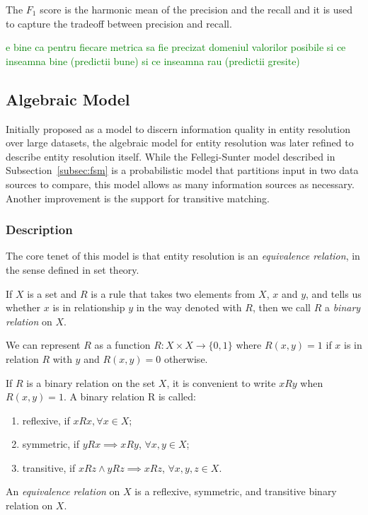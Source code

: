 \documentclass[journal]{IEEEtran}
\begin{document}
    The \textit{$F_1$} score is the harmonic mean of the precision and the
    recall and it is used to capture the tradeoff between precision and
    recall\cite{hitesh2012}.

    \textcolor{green}{e bine ca pentru fiecare metrica sa fie precizat domeniul valorilor posibile si ce inseamna bine (predictii bune) si ce inseamna rau (predictii gresite)}

    \subsection[algebraic]{Algebraic Model}\label{subsec:algebraic}

    Initially proposed as a model to discern information quality in entity
    resolution over large datasets\cite{tal2007algebraic}, the algebraic model
    for entity resolution was later refined to describe entity resolution
    itself\cite{Tal11}.
    While the Fellegi-Sunter model described in Subsection~\ref{subsec:fsm} is a
    probabilistic model that partitions input in two data sources to compare,
    this model allows as many information sources as necessary.
    Another improvement is the support for transitive matching.
    
    \subsubsection[algdesc]{Description}\label{subsubsec:algdesc}

    The core tenet of this model is that entity resolution is an \textit{
    equivalence relation}, in the sense defined in set theory.
    
    \begin{defn} If $X$ is a set and $R$ is a rule that takes two elements from
    $X$, $x$ and $y$, and tells us whether $x$ is in relationship $y$ in the way
    denoted with $R$, then we call $R$ a \textit{binary relation} on
    $X$\cite{hoffman1971linear}.
    \end{defn}

    We can represent $R$ as a function $R:X \times X \rightarrow \{0,1\}$ where
    $R(x,y)=1$ if $x$ is in relation $R$ with $y$ and $R(x,y)=0$ otherwise.
    
    \begin{defn}If $R$ is a binary relation on the set $X$, it is convenient to
    write $xRy$ when $R(x, y) = 1$.
    A binary relation R is called:

    \begin{enumerate}
        \item reflexive, if $xRx, \forall x \in X$;
        \item symmetric, if $yRx \implies xRy$, $\forall x,y \in X$;
        \item transitive, if $xRz \land yRz \implies xRz$, $\forall x,y,z \in X$.
    \end{enumerate}

    An \textit{equivalence relation} on $X$ is a reflexive, symmetric, and
    transitive binary relation on $X$\cite{hoffman1971linear}.
    \end{defn}
\end{document}
